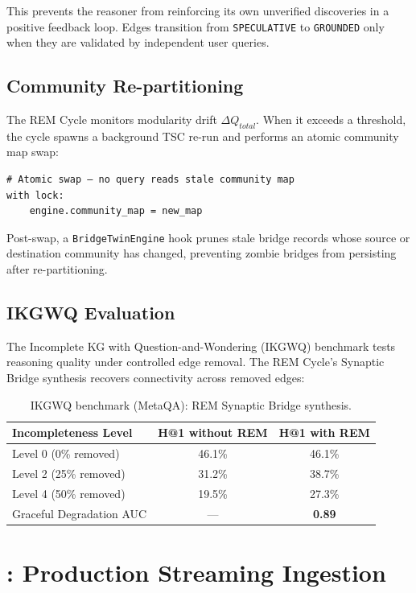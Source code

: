 \documentclass[10pt,twocolumn]{article}
\begin{document}
This prevents the reasoner from reinforcing its own unverified discoveries in a
positive feedback loop. Edges transition from \texttt{SPECULATIVE} to \texttt{GROUNDED}
only when they are validated by independent user queries.

\subsection{Community Re-partitioning}

The REM Cycle monitors modularity drift $\Delta Q_{total}$. When it exceeds a threshold,
the cycle spawns a background TSC re-run and performs an atomic community map swap:
\begin{lstlisting}
# Atomic swap — no query reads stale community map
with lock:
    engine.community_map = new_map
\end{lstlisting}

Post-swap, a \texttt{BridgeTwinEngine} hook prunes stale bridge records whose source
or destination community has changed, preventing zombie bridges from persisting after
re-partitioning.

\subsection{IKGWQ Evaluation}

The Incomplete KG with Question-and-Wondering (IKGWQ) benchmark tests reasoning quality
under controlled edge removal. The REM Cycle's Synaptic Bridge synthesis recovers
connectivity across removed edges:

\begin{table}[h]
\small\centering
\caption{IKGWQ benchmark (MetaQA): REM Synaptic Bridge synthesis.}
\label{tab:ikgwq}
\begin{tabular}{lcc}
\toprule
\textbf{Incompleteness Level} & \textbf{H@1 without REM} & \textbf{H@1 with REM} \\
\midrule
Level 0 (0\% removed)   & 46.1\% & 46.1\% \\
Level 2 (25\% removed)  & 31.2\% & 38.7\% \\
Level 4 (50\% removed)  & 19.5\% & 27.3\% \\
\midrule
Graceful Degradation AUC & — & \textbf{0.89} \\
\bottomrule
\end{tabular}
\end{table}

\section{\THALAMUS{}: Production Streaming Ingestion}
\label{sec:thalamus}
\end{document}
